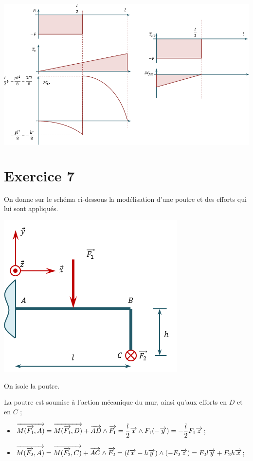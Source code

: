 \documentclass[10pt,fleqn]{article} %
\begin{document}
\begin{multicols}{2}
\begin{corrige}
\begin{center}
\includegraphics[width=.95\linewidth]{images/exo_03_corr_03}
\end{center}
\end{corrige}
\else 
\fi



\section*{Exercice 7}
\setcounter{subparagraph}{0}
On donne sur le schéma ci-dessous la modélisation d'une poutre et des efforts qui lui sont appliqués.
\begin{center}
\includegraphics[width=.45\textwidth]{images/exo_07}
\end{center}



On isole la poutre.

La poutre est soumise à l'action mécanique du mur, ainsi qu'aux efforts en $D$ et en $C$ ;
\begin{itemize}
\item $\overrightarrow{M(\overrightarrow{F_1},A)} 
= \overrightarrow{M(\overrightarrow{F_1},D)}+\overrightarrow{AD}\wedge\overrightarrow{F_1}
= \dfrac{l}{2}\overrightarrow{x} \wedge F_1 (-\overrightarrow{y})
= -\dfrac{l}{2}F_1  \overrightarrow{z} $;
\item $\overrightarrow{M(\overrightarrow{F_2},A)} 
= \overrightarrow{M(\overrightarrow{F_2},C)}+\overrightarrow{AC}\wedge\overrightarrow{F_2}
= \left(l\overrightarrow{x} - h\overrightarrow{y} \right) \wedge\left(-F_2\overrightarrow{z}\right)
= F_2l\overrightarrow{y} +F_2h\overrightarrow{x} $;
\end{itemize}


\end{multicols}
\end{document}
